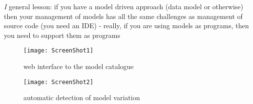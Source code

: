 \textsl{I} general lesson: if you have a model driven approach (data model
  or otherwise) then your management of models has all the same
  challenges as management of source code (you need an IDE) - really,
  if you are using models as programs, then you need to support them
  as programs

\clearpage

\begin{figure*}[h]
  \centering
  \texttt{[image: ScreenShot1]}
  \caption{web interface to the model catalogue}
  \label{fig:webinterface}
\end{figure*}

\begin{figure*}[h]
  \centering
  \texttt{[image: ScreenShot2]}  
  \caption{automatic detection of model variation}
  \label{fig:variation}
\end{figure*}

